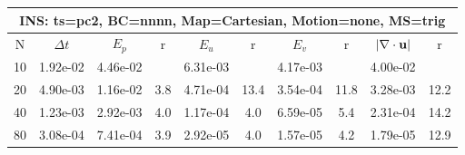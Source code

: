 
\begin{tabular}{|c|c|c|c|c|c|c|c|c|c|} \hline
 \multicolumn{10}{|c|}{INS: ts=pc2, BC=nnnn, Map=Cartesian, Motion=none, MS=trig } \\ \hline 
     N  &   $\Delta t$ & $E_p$   &  r  &   $E_u$   &   r    &   $E_v$   & r   &  $|\nabla\cdot\mathbf{ u}|$  & r   \\ \hline 
  10   &  1.92e-02  &   4.46e-02  &        &   6.31e-03  &        &   4.17e-03  &        &   4.00e-02  &        \\ 
  20   &  4.90e-03  &   1.16e-02  & 3.8  &   4.71e-04  & 13.4  &   3.54e-04  & 11.8  &   3.28e-03  & 12.2  \\ 
  40   &  1.23e-03  &   2.92e-03  & 4.0  &   1.17e-04  & 4.0  &   6.59e-05  & 5.4  &   2.31e-04  & 14.2  \\ 
  80   &  3.08e-04  &   7.41e-04  & 3.9  &   2.92e-05  & 4.0  &   1.57e-05  & 4.2  &   1.79e-05  & 12.9  \\ 
 \hline 
\end{tabular}
